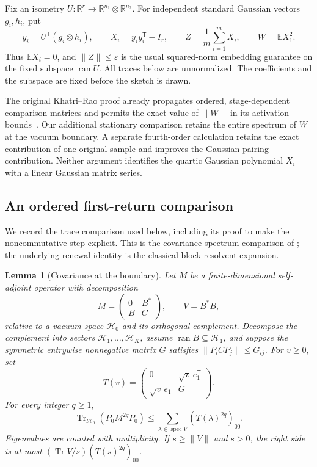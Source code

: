 \documentclass[11pt,a4paper]{article}
\newtheorem{lemma}[theorem]{Lemma}
\theoremstyle{definition}\newtheorem{definition}[theorem]{Definition}
\theoremstyle{remark}\newtheorem{remark}[theorem]{Remark}
\numberwithin{equation}{section}
\begin{document}
Fix an isometry $U:\mathbb R^r\to\mathbb R^{n_1}\otimes\mathbb R^{n_2}$.
For independent standard Gaussian vectors $g_i,h_i$, put
\[
 y_i=U^{\mathsf T}(g_i\otimes h_i),\qquad
 X_i=y_i y_i^{\mathsf T}-I_r,\qquad
 Z=\frac1m\sum_{i=1}^m X_i,\qquad W=\mathbb E X_1^2.
\]
Thus $\mathbb EX_i=0$, and $\|Z\|\le\varepsilon$ is the usual squared-norm
embedding guarantee on the fixed subspace $\operatorname{ran}U$. All traces
below are unnormalized. The coefficients and the subspace are fixed before
the sketch is drawn.

The original Khatri--Rao proof already propagates ordered, stage-dependent
comparison matrices and permits the exact value of $\|W\|$ in its activation
bounds~\cite{KRSource}. Our additional stationary comparison retains the entire
spectrum of $W$ at the vacuum boundary. A separate fourth-order calculation
retains the exact contribution of one original sample and improves the
Gaussian pairing contribution. Neither argument identifies the quartic
Gaussian polynomial $X_i$ with a linear Gaussian matrix series.

\subsection{An ordered first-return comparison}

We record the trace comparison used below, including its proof to make the
noncommutative step explicit. This is the covariance-spectrum comparison of
\cite[Theorem 4.3 and Corollary 4.4]{GradedSource}; the underlying renewal identity
is the classical block-resolvent expansion.

\begin{lemma}[Covariance at the boundary]\label{lem:kr-boundary}
Let $M$ be a finite-dimensional self-adjoint operator with decomposition
\[
 M=\begin{pmatrix}0&B^*\\B&C\end{pmatrix},\qquad V=B^*B,
\]
relative to a vacuum space $\mathcal H_0$ and its orthogonal complement.
Decompose the complement into sectors $\mathcal H_1,\ldots,\mathcal H_K$,
assume $\operatorname{ran}B\subseteq\mathcal H_1$, and suppose the symmetric
entrywise nonnegative matrix $G$ satisfies $\|P_iCP_j\|\le G_{ij}$.
For $v\ge0$, set
\[
 T(v)=\begin{pmatrix}0&\sqrt v\,e_1^{\mathsf T}\\
                       \sqrt v\,e_1&G\end{pmatrix}.
\]
For every integer $q\ge1$,
\begin{equation}\label{eq:kr-boundary-general}
 \operatorname{Tr}_{\mathcal H_0}(P_0M^{2q}P_0)
 \le\sum_{\lambda\in\operatorname{spec}V}(T(\lambda)^{2q})_{00}.
\end{equation}
Eigenvalues are counted with multiplicity. If $s\ge\|V\|$ and $s>0$, the
right side is at most $(\operatorname{Tr}V/s)(T(s)^{2q})_{00}$.
\end{lemma}
\end{document}
